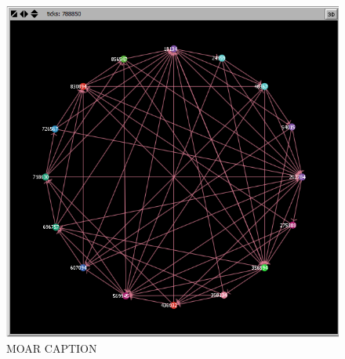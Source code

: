 \documentclass[12pt]{article} %
\begin{document}
\begin{figure}
\includegraphics[width=\linewidth]{fixed_example}
\caption{MOAR CAPTION}
\label{fixed}
\end{figure}








\end{document}
